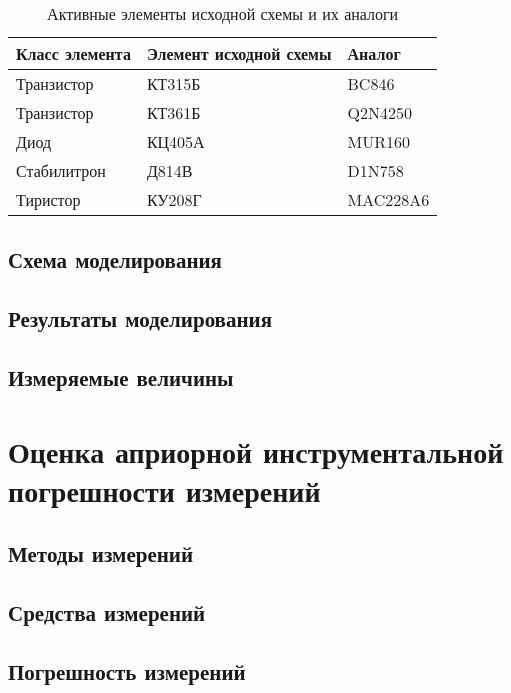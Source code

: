 \begin{table}[H]
\begin{center}
	\caption{Активные элементы исходной схемы и их аналоги}
	\label{tab:elements_analogs}
	\def\tabcolsep{10pt}
	\begin{tabular}{|l|l|l|}
		\hline
		Класс элемента &
		Элемент исходной схемы & 
		Аналог \\
		\hline
		Транзистор &
		КТ315Б &
		BC846 \\
		\hline
		Транзистор &
		КТ361Б &
		Q2N4250 \\
		\hline
		Диод &
		КЦ405А &
		MUR160 \\
		\hline
		Стабилитрон &
		Д814В &
		D1N758 \\
		\hline
		Тиристор &
		КУ208Г &
		MAC228A6 \\
		\hline
\end{tabular}
\end{center}
\end{table}

\subsection{Схема моделирования}

\subsection{Результаты моделирования}

\subsection{Измеряемые величины}

\section{Оценка априорной инструментальной погрешности измерений}

\subsection{Методы измерений}

\subsection{Средства измерений}

\subsection{Погрешность измерений}


